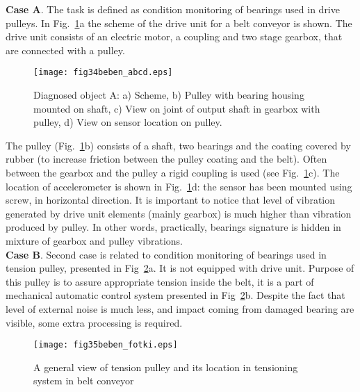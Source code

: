 \documentclass[3p,times]{elsarticle}
\begin{document}
\textbf{Case A}. The task is defined as condition monitoring of bearings used in drive pulleys. In Fig.~\ref{fig33}a the scheme of the drive unit for a belt conveyor is shown. The drive unit consists of an electric motor, a coupling and two stage gearbox, that are connected with a pulley.
\begin{figure}[!ht]
\begin{center}
\texttt{[image: fig34beben\_abcd.eps]}
\caption{Diagnosed object A: a) Scheme, b) Pulley with bearing housing mounted on shaft, c) View on joint of output shaft in gearbox with pulley, d) View on sensor location on pulley.
}\label{fig33}
\end{center}
\end{figure}
The pulley (Fig.~\ref{fig33}b) consists of a shaft, two bearings and the coating covered by rubber (to increase friction between the pulley coating and the belt). Often between the gearbox and the pulley a rigid coupling is used (see Fig.~\ref{fig33}c). The location of accelerometer is shown in Fig.~\ref{fig33}d: the sensor has been mounted using screw, in horizontal direction. It is important to notice that level of vibration generated by drive unit elements (mainly gearbox) is much higher than vibration produced by pulley. In other words, practically, bearings signature is hidden in mixture of gearbox and pulley vibrations.\\
\textbf{Case B}. Second case is related to condition monitoring of bearings used in tension pulley, presented in Fig~\ref{fig44}a. It is not equipped with drive unit. Purpose of this pulley is to assure appropriate tension inside the belt, it is a part of mechanical automatic control system presented in Fig~\ref{fig44}b. Despite the fact that level of external noise is much less, and impact coming from damaged bearing are visible, some extra processing is required.
\begin{figure}[!ht]
\begin{center}
\texttt{[image: fig35beben\_fotki.eps]}
\caption{A general view of tension pulley and its location in tensioning system in belt conveyor}
\label{fig44}
\end{center}
\end{figure}
\end{document}

